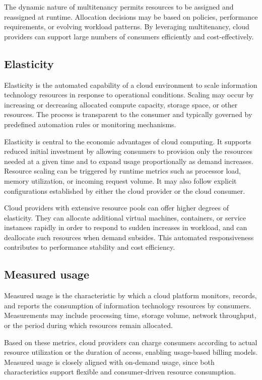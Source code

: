 \documentclass[11pt,a4paper,openany]{report}
\begin{document}
The dynamic nature of multitenancy permits resources to be assigned and reassigned at runtime. Allocation decisions may be based on policies, performance requirements, or evolving workload patterns. By leveraging multitenancy, cloud providers can support large numbers of consumers efficiently and cost-effectively.

\subsection{Elasticity}

Elasticity is the automated capability of a cloud environment to scale information technology resources in response to operational conditions. Scaling may occur by increasing or decreasing allocated compute capacity, storage space, or other resources. The process is transparent to the consumer and typically governed by predefined automation rules or monitoring mechanisms.

Elasticity is central to the economic advantages of cloud computing. It supports reduced initial investment by allowing consumers to provision only the resources needed at a given time and to expand usage proportionally as demand increases. Resource scaling can be triggered by runtime metrics such as processor load, memory utilization, or incoming request volume. It may also follow explicit configurations established by either the cloud provider or the cloud consumer.

Cloud providers with extensive resource pools can offer higher degrees of elasticity. They can allocate additional virtual machines, containers, or service instances rapidly in order to respond to sudden increases in workload, and can deallocate such resources when demand subsides. This automated responsiveness contributes to performance stability and cost efficiency.

\subsection{Measured usage}

Measured usage is the characteristic by which a cloud platform monitors, records, and reports the consumption of information technology resources by consumers. Measurements may include processing time, storage volume, network throughput, or the period during which resources remain allocated.

Based on these metrics, cloud providers can charge consumers according to actual resource utilization or the duration of access, enabling usage-based billing models. Measured usage is closely aligned with on-demand usage, since both characteristics support flexible and consumer-driven resource consumption.
\end{document}
